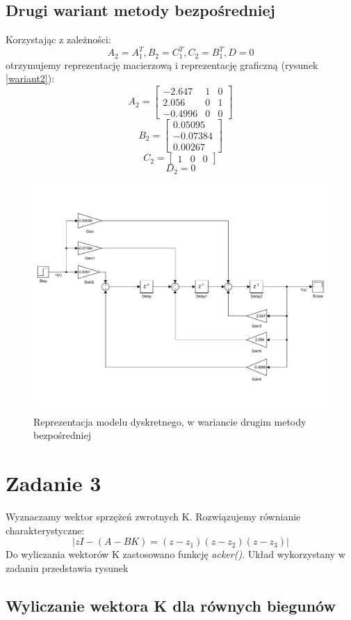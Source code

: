 \documentclass{article}
\begin{document}
\subsection{Drugi wariant metody bezpośredniej}
Korzystając z zależności:
\[A_2 = A_1^T, B_2 = C_1^T, C_2 = B_1^T, D = 0\]
otrzymujemy reprezentację macierzową i reprezentację graficzną (rysunek \ref{wariant2}):
\[A_2=\begin{bmatrix}
-2.647 & 1 & 0 \\ 2.056 & 0 & 1 \\ -0.4996 & 0 & 0
\end{bmatrix}\]
\[B_2=\begin{bmatrix}
0.05095 \\ -0.07384 \\ 0.00267
\end{bmatrix}\]
\[C_2=\begin{bmatrix}
1 & 0 & 0
\end{bmatrix}\]
\[D_2 = 0\]
\begin{figure}[h]
\centering
\includegraphics[width=0.8\linewidth]{wariant2}
\caption{Reprezentacja modelu dyskretnego, w wariancie drugim metody bezpośredniej}
\label{fig:wariant2}
\end{figure}
\section{Zadanie 3}
Wyznaczamy wektor sprzężeń zwrotnych K. Rozwiązujemy równianie charakterystyczne:
\[|zI -(A-BK) = (z-z_1)(z-z_2)(z-z_3)|\]
Do wyliczania wektorów K zastosowano funkcję \textit{acker()}.
Układ wykorzystany w zadaniu przedstawia rysunek
\subsection{Wyliczanie wektora K dla równych biegunów}
\end{document}
